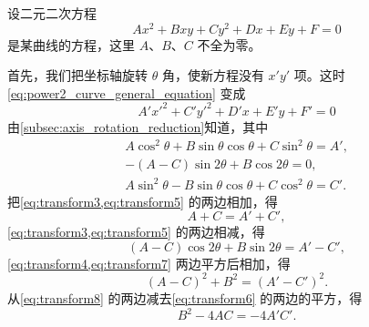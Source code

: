 设二元二次方程
\begin{equation}
  \label{eq:power2_curve_general_equation}
  Ax^2+Bxy+Cy^2+Dx+Ey+F=0
\end{equation}
是某曲线的方程，这里 $A$、$B$、$C$ 不全为零。

首先，我们把坐标轴旋转 $\theta$ 角，使新方程没有 $x'y'$ 项。这时\cref{eq:power2_curve_general_equation} 变成
\begin{equation}
  \label{eq:power2_curve_transform}
  A'x'^2+C'y'^2+D'x+E'y+F'=0
\end{equation}
由\cref{subsec:axis_rotation_reduction}知道，其中
\begin{gather}
  \label{eq:transform3} A\cos^2\theta+B\sin\theta\cos\theta+C\sin^2\theta=A',\\
  \label{eq:transform4} -(A-C)\sin2\theta+B\cos2\theta=0,\\
  \label{eq:transform5} A\sin^2\theta-B\sin\theta\cos\theta+C\cos^2\theta=C'.
\end{gather}
把\cref{eq:transform3,eq:transform5} 的两边相加，得
\begin{equation}
  \label{eq:transform6}
  A+C=A'+C',
\end{equation}
\cref{eq:transform3,eq:transform5} 的两边相减，得
\begin{equation}
  \label{eq:transform7}
  (A-C)\cos2\theta+B\sin2\theta=A'-C',
\end{equation}
\cref{eq:transform4,eq:transform7} 两边平方后相加，得
\begin{equation}
  \label{eq:transform8}
  (A-C)^2+B^2=(A'-C')^2.
\end{equation}
从\cref{eq:transform8} 的两边减去\cref{eq:transform6} 的两边的平方，得
\[B^2-4AC=-4A'C'.\]

